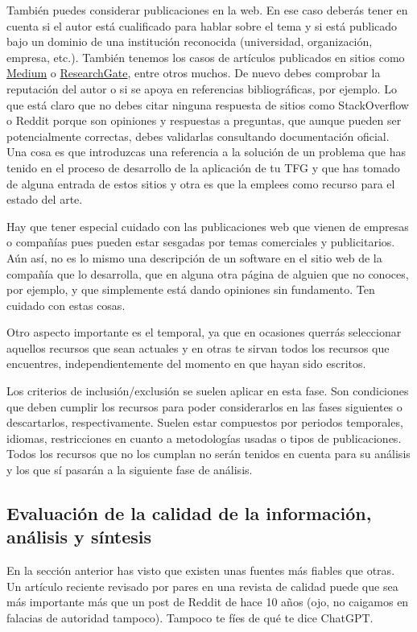 También puedes considerar publicaciones en la web. En ese caso deberás tener en cuenta si el autor está cualificado para hablar sobre el tema y si está publicado bajo un dominio de una institución reconocida (universidad, organización, empresa, etc.). También tenemos los casos de artículos publicados en sitios como \href{www.medium.com}{Medium} o \href{www.researchgate.net}{ResearchGate}, entre otros muchos. De nuevo debes comprobar la reputación del autor o si se apoya en referencias bibliográficas, por ejemplo. Lo que está claro que no debes citar ninguna respuesta de sitios como StackOverflow o Reddit porque son opiniones y respuestas a preguntas, que aunque pueden ser potencialmente correctas, debes validarlas consultando documentación oficial. Una cosa es que introduzcas una referencia a la solución de un problema que has tenido en el proceso de desarrollo de la aplicación de tu TFG y que has tomado de alguna entrada de estos sitios y otra es que la emplees como recurso para el estado del arte.

Hay que tener especial cuidado con las publicaciones web que vienen de empresas o compañías pues pueden estar sesgadas por temas comerciales y publicitarios. Aún así, no es lo mismo una descripción de un software en el sitio web de la compañía que lo desarrolla, que en alguna otra página de alguien que no conoces, por ejemplo, y que simplemente está dando opiniones sin fundamento. Ten cuidado con estas cosas.  

Otro aspecto importante es el temporal, ya que en ocasiones querrás seleccionar aquellos recursos que sean actuales y en otras te sirvan todos los recursos que encuentres, independientemente del momento en que hayan sido escritos. 

Los criterios de inclusión/exclusión se suelen aplicar en esta fase. Son condiciones que deben cumplir los recursos para poder considerarlos en las fases siguientes o descartarlos, respectivamente. Suelen estar compuestos por periodos temporales, idiomas, restricciones en cuanto a metodologías usadas o tipos de publicaciones. Todos los recursos que no los cumplan no serán tenidos en cuenta para su análisis y los que sí pasarán a la siguiente fase de análisis.

\subsection{Evaluación de la calidad de la información, análisis y síntesis}

En la sección anterior has visto que existen unas fuentes más fiables que otras. Un artículo reciente revisado por pares en una revista de calidad puede que sea más importante más que un post de Reddit de hace 10 años (ojo, no caigamos en falacias de autoridad tampoco). Tampoco te fíes de qué te dice ChatGPT.

